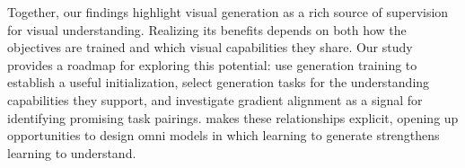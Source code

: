 Together, our findings highlight visual generation as a rich source of supervision for visual understanding. Realizing its benefits depends on both how the objectives are trained and which visual capabilities they share.
Our study provides a roadmap for exploring this potential: use generation training to establish a useful initialization, select generation tasks for the understanding capabilities they support, and investigate gradient alignment as a signal for identifying promising task pairings.
\methodname makes these relationships explicit, opening up opportunities to design omni models in which learning to generate strengthens learning to understand.




